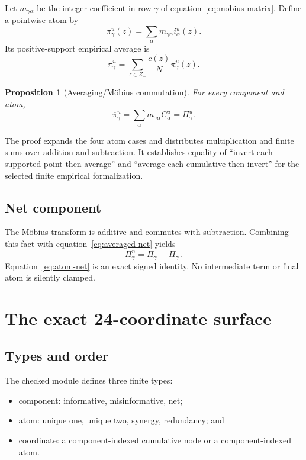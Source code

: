 \documentclass[11pt]{article}
\newtheorem{proposition}[theorem]{Proposition}
\theoremstyle{definition}
\begin{document}
Let \(m_{\gamma\alpha}\) be the integer coefficient in row \(\gamma\) of
equation~\eqref{eq:mobius-matrix}.  Define a pointwise atom by
\begin{equation}\label{eq:pointwise-atom}
\pi^u_\gamma(z)=\sum_\alpha m_{\gamma\alpha}i^u_\alpha(z).
\end{equation}
Its positive-support empirical average is
\begin{equation}\label{eq:average-pointwise}
\overline\pi^u_\gamma
=\sum_{z\in Z_+}\frac{c(z)}{N}\pi^u_\gamma(z).
\end{equation}

\begin{proposition}[Averaging/M\"obius commutation]\label{prop:commute}
For every component and atom,
\begin{equation}\label{eq:commute}
\overline\pi^u_\gamma
=\sum_\alpha m_{\gamma\alpha}C^u_\alpha
=\Pi^u_\gamma.
\end{equation}
\end{proposition}

The proof expands the four atom cases and distributes multiplication and finite sums over addition
and subtraction.  It establishes equality of ``invert each supported point then average'' and
``average each cumulative then invert'' for the selected finite empirical formalization.

\subsection{Net component}

The M\"obius transform is additive and commutes with subtraction.  Combining this fact with
equation~\eqref{eq:averaged-net} yields
\begin{equation}\label{eq:atom-net}
\Pi^n_\gamma=\Pi^+_\gamma-\Pi^-_\gamma.
\end{equation}
Equation~\eqref{eq:atom-net} is an exact signed identity.  No intermediate term or final atom is
silently clamped.

\section{The exact 24-coordinate surface}

\subsection{Types and order}

The checked module defines three finite types:
\begin{itemize}[leftmargin=*]
  \item component: informative, misinformative, net;
  \item atom: unique one, unique two, synergy, redundancy; and
  \item coordinate: a component-indexed cumulative node or a component-indexed atom.
\end{itemize}
\end{document}
